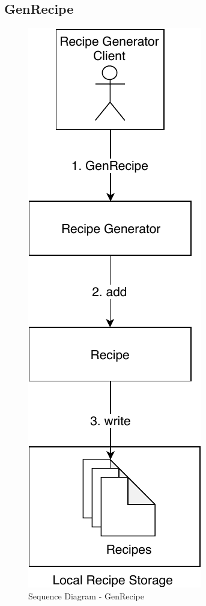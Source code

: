 \subsection{GenRecipe}
\begin{figure}[ht]
	\centering
  \includegraphics[height=0.6\textheight]{img/SequenceDiagram-GenRecipe.pdf}
	\caption{Sequence Diagram - GenRecipe}
	\label{fig:SequenceDiagram-GenRecipe}
\end{figure}

